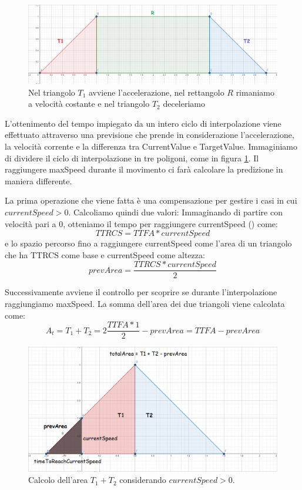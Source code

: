 \documentclass[main.tex]{subfiles}
\begin{document}
\begin{figure}
    \centering
    \captionsetup{justification=centering}
    \includegraphics[scale=0.25]{img/interpolazione/movementThreeParts.png}
    \caption{Nel triangolo $T_1$ avviene l'accelerazione, nel rettangolo $R$ rimaniamo a velocità costante e nel triangolo $T_2$ deceleriamo}
    \label{fig:4_movementThreeParts}
\end{figure}
L'ottenimento del tempo impiegato da un intero ciclo di interpolazione viene effettuato attraverso una previsione che prende in considerazione l'accelerazione, la velocità corrente e la differenza tra CurrentValue e TargetValue. Immaginiamo di dividere il ciclo di interpolazione in tre poligoni, come in figura \ref{fig:4_movementThreeParts}. Il raggiungere maxSpeed durante il movimento ci farà calcolare la predizione in maniera differente. \newline

La prima operazione che viene fatta è una compensazione per gestire i casi in cui $currentSpeed > 0$. Calcoliamo quindi due valori: Immaginando di partire con velocità pari a 0, otteniamo il tempo per raggiungere currentSpeed () come:
\[TTRCS = TTFA * currentSpeed\]
e lo spazio percorso fino a raggiungere currentSpeed come l'area di un triangolo che ha TTRCS come base e currentSpeed come altezza:
\[prevArea = \frac{TTRCS * currentSpeed}{2}\]

Successivamente avviene il controllo per scoprire se durante l'interpolazione raggiungiamo maxSpeed. La somma dell'area dei due triangoli viene calcolata come:
\[A_t = T_1 + T_2 = 2\frac{TTFA * 1}{2} - prevArea = TTFA - prevArea\]
\begin{figure}[H]
    \centering
    \includegraphics[width=.9\linewidth]{img/interpolazione/speedCapTriangleAreaSplice.png}
    \caption{Calcolo dell'area $T_1 + T_2$ considerando $currentSpeed > 0$.}
    \label{fig:4_speedCapTriangleAreaSplice}
\end{figure}
\end{document}
